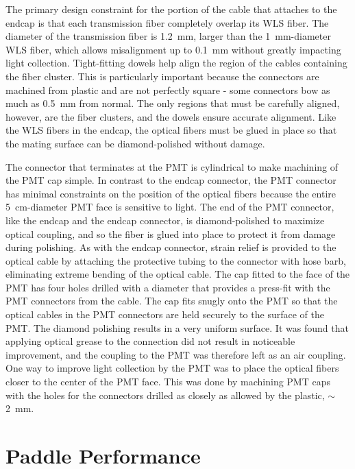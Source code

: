 The primary design constraint for the portion of the cable that attaches to the endcap is that each transmission fiber completely overlap its WLS fiber.  The diameter of the transmission fiber is 1.2~mm, larger than the 1~mm-diameter WLS fiber, which allows misalignment up to 0.1~mm without greatly impacting light collection.  Tight-fitting dowels help align the region of the cables containing the fiber cluster.  This is particularly important because the connectors are machined from plastic and are not perfectly square - some connectors bow as much as 0.5~mm from normal.  The only regions that must be carefully aligned, however, are the fiber clusters, and the dowels ensure accurate alignment.  Like the WLS fibers in the endcap, the optical fibers must be glued in place so that the mating surface can be diamond-polished without damage.  

The connector that terminates at the PMT is cylindrical to make machining of the PMT cap simple.  In contrast to the endcap connector, the PMT connector has minimal constraints on the position of the optical fibers because the entire 5~cm-diameter PMT face is sensitive to light.  The end of the PMT connector, like the endcap and the endcap connector, is diamond-polished to maximize optical coupling, and so the fiber is glued into place to protect it from damage during polishing.  As with the endcap connector, strain relief is provided to the optical cable by attaching the protective tubing to the connector with hose barb, eliminating extreme bending of the optical cable.    
The cap fitted to the face of the PMT has four holes drilled with a diameter that provides a press-fit with the PMT connectors from the cable.  The cap fits snugly onto the PMT so that the optical cables in the PMT connectors are held securely to the surface of the PMT.  The diamond polishing results in a very uniform surface.  It was found that applying optical grease to the connection did not result in noticeable improvement, and the coupling to the PMT was therefore left as an air coupling.  One way to improve light collection by the PMT was to place the optical fibers closer to the center of the PMT face.  This was done by machining PMT caps with the holes for the connectors drilled as closely as allowed by the plastic, $\sim$2~mm.


\section{Paddle Performance}
\label{sec:singleVeto}

